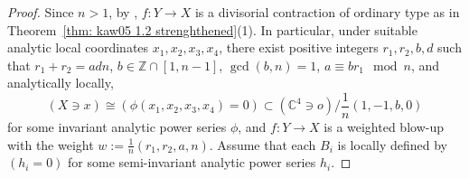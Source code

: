 \documentclass[11pt]{amsart}
\numberwithin{equation}{section}
\newcommand{\Zz}{\mathbb{Z}}
\theoremstyle{definition}
\theoremstyle{definition}
\begin{document}
\begin{proof}
Since $n>1$, by \cite[Theorem~1.3]{Kaw05}, $f: Y\to X$ is a divisorial contraction of ordinary type as in Theorem~\ref{thm: kaw05 1.2 strenghthened}(1). In particular, under suitable analytic local coordinates $x_1,x_2,x_3,x_4$, there exist positive integers $r_1,r_2,b,d$ such that $r_1+r_2=adn$, $b\in \Zz\cap [1,n-1]$, $\gcd(b,n)=1$, $a\equiv br_1\mod n$, and analytically locally, $$(X\ni x)\cong (\phi(x_1,x_2,x_3,x_4)=0)\subset (\mathbb C^4\ni o)/\frac{1}{n}(1,-1,b,0)$$
for some invariant analytic power series $\phi$, and $f: Y\to X$ is a weighted blow-up with the weight $w:=\frac{1}{n}(r_1,r_2,a,n)$. Assume that each $B_{i}$ is locally defined by $(h_i=0)$ for some semi-invariant analytic power series $h_{i}$.

\medskip
    

\end{proof}
\end{document}
